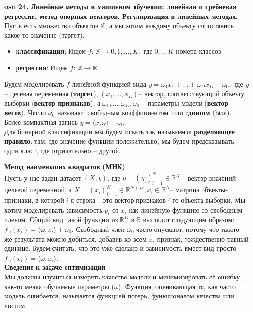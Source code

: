\setcounter{section}{15}
\setcounter{subsection}{24}
\setcounter{equation}{0}
\textbf{\LARGE osn 24. Линейные методы в машинном обучении: линейная и гребневая регрессии, метод опорных векторов. Регуляризация в линейных методах. }  \\

Пусть есть множество объектов $\mathbb{X}$, а мы хотим каждому объекту сопоставить какое-то значение (таргет).

\begin{itemize}
    \item \textbf{классификация}: Ищем $f$: $\mathbb{X} \xrightarrow{}0,1,...,K,$ где $0,..,K$-номера классов
    \item \textbf{регрессия}:  Ищем $f$: $\mathbb{X} \xrightarrow{} \mathbb{R}$
\end{itemize}
Будем моделировать $f$ линейной функцией вида $ y = \omega_1x_1+...+\omega_Dx_D+\omega_0,$ где $y$ – целевая переменная (\textbf{таргет}), $(x_1,...,x_D)$– вектор, соответствующий объекту выборки (\textbf{вектор признаков}), а $\omega_1,...,\omega_D,\omega_0$ – параметры модели (\textbf{вектор весов}). Число $\omega_0$ называют свободным коэффициентом, или \textbf{сдвигом} (bias). Более компактная запись $y = \langle{x, \omega}\rangle+\omega_0$. \\
Для бинарной классификации мы будем искать так называемое \textbf{разделяющее правило}: там, где значение функции положительно, мы будем предсказывать один класс, где отрицательно – другой.

\textbf{Метод наименьших квадратов (МНК)} \\
Пусть у нас задан датасет $(X, y)$, где 
$y=(y_i)_{i=1}^N \in \mathbb{R}^{N}$ – вектор значений целевой переменной, а $X=(x_i)_{i=1}^N \in \mathbb{R}^{N+D}, x_i \in \mathbb{R}^{N}$– матрица объекты-признаки, в которой 
$i$-я строка – это вектор признаков 
$i$-го объекта выборки. Мы хотим моделировать зависимость $y_i$ от $x_i$ как линейную функцию со свободным членом. Общий вид такой функции из $\mathbb{R}^D$ в $\mathbb{R}$ выглядит следующим образом: $ f_{\omega}(x_i)=\langle\omega,x_i\rangle+\omega_0$.
Свободный член $\omega_0$ часто опускают, потому что такого же результата можно добиться, добавив ко всем $x_i$ признак, тождественно равный единице. Будем считать, что это уже сделано и зависимость имеет вид просто $f_\omega(x_i)=\langle\omega,x_i\rangle$. \\
\textbf{Сведение к задаче оптимизации} \\
Мы должны научиться измерять качество модели и минимизировать её ошибку, как-то меняя обучаемые параметры ($\omega$). Функция, оценивающая то, как часто модель ошибается, называется функцией потерь, функционалом качества или лоссом.

